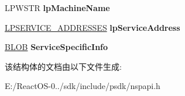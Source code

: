 \begin{DoxyCompactItemize}
L\+P\+W\+S\+TR {\bfseries lp\+Machine\+Name}
\item 
\mbox{\label{struct___s_e_r_v_i_c_e___i_n_f_o_w_accdfaba4a6eb72a8446123da87fda741}} 
\hyperlink{struct___s_e_r_v_i_c_e___a_d_d_r_e_s_s_e_s}{L\+P\+S\+E\+R\+V\+I\+C\+E\+\_\+\+A\+D\+D\+R\+E\+S\+S\+ES} {\bfseries lp\+Service\+Address}
\item 
\mbox{\label{struct___s_e_r_v_i_c_e___i_n_f_o_w_aca135f34d1e7204ecf5456ac72a36bdb}} 
\hyperlink{struct___b_l_o_b}{B\+L\+OB} {\bfseries Service\+Specific\+Info}
\end{DoxyCompactItemize}


该结构体的文档由以下文件生成\+:\begin{DoxyCompactItemize}
\item 
E\+:/\+React\+O\+S-\/0../sdk/include/psdk/nspapi.\+h\end{DoxyCompactItemize}
